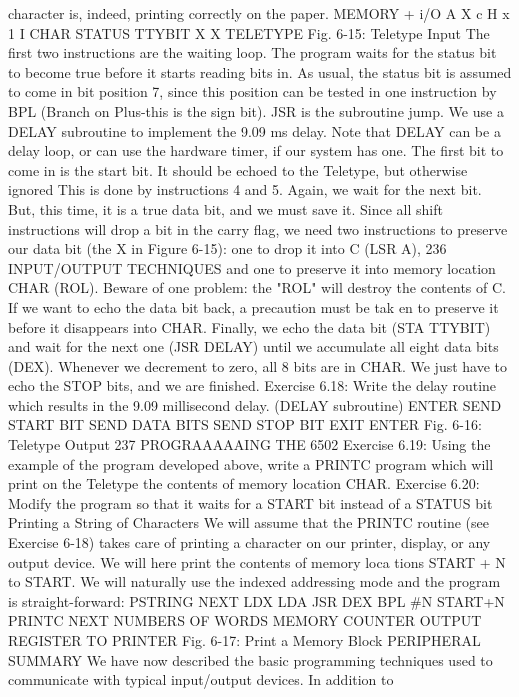 character is, indeed, printing correctly on the paper.
MEMORY + i/O
A
X
c
H x 1
I CHAR
STATUS
TTYBIT
X
X
TELETYPE
Fig. 6-15: Teletype Input
The first two instructions are the waiting loop. The program waits
for the status bit to become true before it starts reading bits in.
As usual, the status bit is assumed to come in bit position 7,
since this position can be tested in one instruction by BPL (Branch
on Plus-this is the sign bit).
JSR is the subroutine jump. We use a DELAY subroutine to
implement the 9.09 ms delay. Note that DELAY can be a delay loop,
or can use the hardware timer, if our system has one.
The first bit to come in is the start bit. It should be echoed to the
Teletype, but otherwise ignored This is done by instructions 4 and 5.
Again, we wait for the next bit. But, this time, it is a true
data bit, and we must save it. Since all shift instructions will
drop a bit in the carry flag, we need two instructions to preserve
our data bit (the X in Figure 6-15): one to drop it into C (LSR A),
236
INPUT/OUTPUT TECHNIQUES
and one to preserve it into memory location CHAR (ROL).
Beware of one problem: the "ROL" will destroy the contents of
C. If we want to echo the data bit back, a precaution must be tak
en to preserve it before it disappears into CHAR. Finally, we echo
the data bit (STA TTYBIT) and wait for the next one (JSR
DELAY) until we accumulate all eight data bits (DEX).
Whenever we decrement to zero, all 8 bits are in CHAR. We
just have to echo the STOP bits, and we are finished.
Exercise 6.18: Write the delay routine which results in the 9.09
millisecond delay. (DELAY subroutine)
ENTER
SEND START
BIT
SEND DATA
BITS
SEND STOP
BIT
EXIT
ENTER
Fig. 6-16: Teletype Output
237
PROGRAAAAAING THE 6502
Exercise 6.19: Using the example of the program developed
above, write a PRINTC program which will print on the Teletype
the contents of memory location CHAR.
Exercise 6.20: Modify the program so that it waits for a START
bit instead of a STATUS bit
Printing a String of Characters
We will assume that the PRINTC routine (see Exercise 6-18)
takes care of printing a character on our printer, display, or any
output device. We will here print the contents of memory loca
tions START + N to START.
We will naturally use the indexed addressing mode and the
program is straight-forward:
PSTRING
NEXT
LDX
LDA
JSR
DEX
BPL
#N
START+N
PRINTC
NEXT
NUMBERS OF WORDS
MEMORY
COUNTER
OUTPUT REGISTER
TO PRINTER
Fig. 6-17: Print a Memory Block
PERIPHERAL SUMMARY
We have now described the basic programming techniques used
to communicate with typical input/output devices. In addition to
